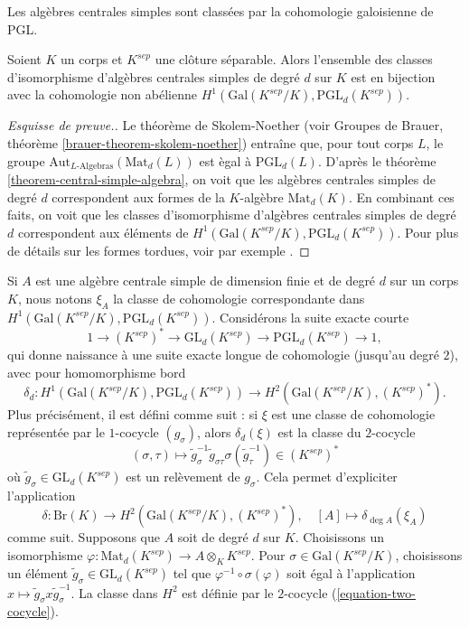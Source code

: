 \begin{lemma}
\label{lemma-central-simple-algebra-pgln}
\begin{slogan}
Les alg\`ebres centrales simples sont class\'ees par la cohomologie galoisienne de PGL.
\end{slogan}
Soient $K$ un corps et $K^{sep}$ une cl\^oture s\'eparable.
Alors l'ensemble des classes d'isomorphisme d'alg\`ebres centrales simples de degr\'e
$d$ sur $K$ est en bijection avec la cohomologie non ab\'elienne
$H^1(\text{Gal}(K^{sep}/K), \text{PGL}_d(K^{sep}))$.
\end{lemma}

\begin{proof}[Esquisse de preuve.]
Le th\'eor\`eme de Skolem-Noether (voir
Groupes de Brauer, th\'eor\`eme \ref{brauer-theorem-skolem-noether})
entra\^ine que, pour tout corps $L$, le groupe
$\text{Aut}_{L\text{-Algebras}}(\text{Mat}_d(L))$
est \`egal \`a $\text{PGL}_d(L)$. D'apr\`es le
th\'eor\`eme \ref{theorem-central-simple-algebra}, on voit que les
alg\`ebres centrales simples de degr\'e $d$ correspondent
aux formes de la $K$-alg\`ebre $\text{Mat}_d(K)$.
En combinant ces faits, on voit que les classes d'isomorphisme d'alg\`ebres
centrales simples de degr\'e $d$ correspondent aux \'el\'ements de
$H^1(\text{Gal}(K^{sep}/K), \text{PGL}_d(K^{sep}))$.
Pour plus de d\'etails sur les formes tordues, voir par exemple
\cite{SilvermanEllipticCurves}.
\end{proof}

\noindent
Si $A$ est une alg\`ebre centrale simple de dimension finie et de degr\'e $d$ sur un corps $K$,
nous notons $\xi_A$ la classe de cohomologie correspondante dans
$H^1(\text{Gal}(K^{sep}/K), \text{PGL}_d(K^{sep}))$.
Consid\'erons la suite exacte courte
$$
1 \to (K^{sep})^* \to \text{GL}_d(K^{sep}) \to \text{PGL}_d(K^{sep}) \to 1,
$$
qui donne naissance \`a une suite exacte longue de cohomologie (jusqu'au degr\'e $2$), avec
pour homomorphisme bord
$$
\delta_d :
H ^1(\text{Gal}(K^{sep}/K), \text{PGL}_d(K^{sep}))
\longrightarrow
H^2(\text{Gal}(K^{sep}/K), (K^{sep})^*).
$$
Plus pr\'ecis\'ement, il est d\'efini comme suit : si $\xi$ est une classe de cohomologie
repr\'esent\'ee par le $1$-cocycle $(g_\sigma)$, alors $\delta_d(\xi)$ est la
classe du $2$-cocycle
\begin{equation}
\label{equation-two-cocycle}
(\sigma, \tau)
\longmapsto
\tilde g_\sigma^{-1} \tilde g_{\sigma \tau} \sigma(\tilde g_\tau^{-1})
\in (K^{sep})^*
\end{equation}
o\`u $\tilde g_\sigma \in \text{GL}_d(K^{sep})$ est un rel\`evement de $g_\sigma$.
Cela permet d'expliciter l'application
$$
\delta : \text{Br}(K) \longrightarrow H^2(\text{Gal}(K^{sep}/K), (K^{sep})^*),
\quad
[A] \longmapsto \delta_{\deg A} (\xi_A)
$$
comme suit. Supposons que $A$ soit de degr\'e $d$ sur $K$. Choisissons un isomorphisme
$\varphi : \text{Mat}_d(K^{sep}) \to A \otimes_K K^{sep}$. Pour
$\sigma \in \text{Gal}(K^{sep}/K)$, choisissons un \'el\'ement
$\tilde g_\sigma \in \text{GL}_d(K^{sep})$ tel que
$\varphi^{-1} \circ \sigma(\varphi)$ soit \'egal \`a l'application
$x \mapsto \tilde g_\sigma x \tilde g_\sigma^{-1}$. La classe dans $H^2$
est d\'efinie par le $2$-cocycle (\ref{equation-two-cocycle}).

